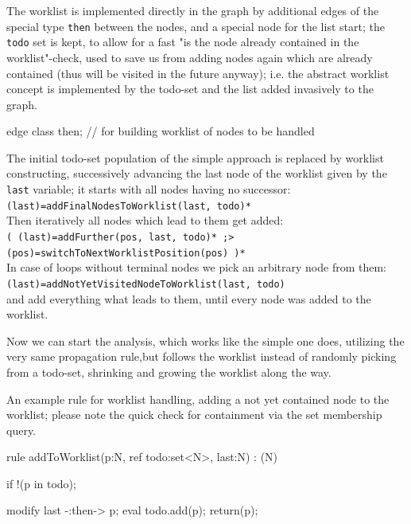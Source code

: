 The worklist is implemented directly in the graph by additional edges of the special type \verb#then# between the nodes, and a special node for the list start; the \verb#todo# set is kept, to allow for a fast "is the node already contained in the worklist"-check, used to save us from adding nodes again which are already contained (thus will be visited in the future anyway); i.e. the abstract worklist concept is implemented by the todo-set and the list added invasively to the graph.

  \begin{example}
    \begin{grgen}
edge class then; // for building worklist of nodes to be handled
    \end{grgen}
  \end{example}

\noindent The initial todo-set population of the simple approach is replaced by worklist constructing, successively advancing the last node of the worklist given by the \verb#last# variable; it starts with all nodes having no successor:\\
\verb#(last)=addFinalNodesToWorklist(last, todo)*#\\
Then iteratively all nodes which lead to them get added:\\
\verb#( (last)=addFurther(pos, last, todo)* ;> (pos)=switchToNextWorklistPosition(pos) )*#\\
In case of loops without terminal nodes we pick an arbitrary node from them:\\ \verb#(last)=addNotYetVisitedNodeToWorklist(last, todo)#\\
and add everything what leads to them, until every node was added to the worklist.

Now we can start the analysis, which works like the simple one does, utilizing the very same propagation rule,but follows the worklist instead of randomly picking from a todo-set, shrinking and growing the worklist along the way.

  \begin{example}
An example rule for worklist handling, adding a not yet contained node to the worklist; please note the quick check for containment via the set membership query.
    \begin{grgen}
rule addToWorklist(p:N, ref todo:set<N>, last:N) : (N)
{
  if{ !(p in todo); }

  modify {
    last -:then-> p;
    eval { todo.add(p); }
    return(p);
  }
}
    \end{grgen}
  \end{example}

